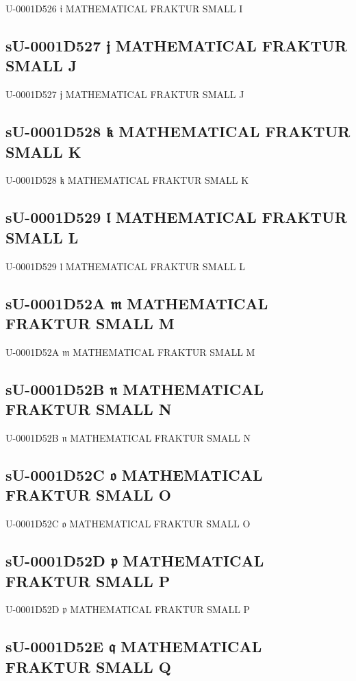U-0001D526 𝔦 MATHEMATICAL FRAKTUR SMALL I

\subsection{sU-0001D527 𝔧 MATHEMATICAL FRAKTUR SMALL J}

U-0001D527 𝔧 MATHEMATICAL FRAKTUR SMALL J

\subsection{sU-0001D528 𝔨 MATHEMATICAL FRAKTUR SMALL K}

U-0001D528 𝔨 MATHEMATICAL FRAKTUR SMALL K

\subsection{sU-0001D529 𝔩 MATHEMATICAL FRAKTUR SMALL L}

U-0001D529 𝔩 MATHEMATICAL FRAKTUR SMALL L

\subsection{sU-0001D52A 𝔪 MATHEMATICAL FRAKTUR SMALL M}

U-0001D52A 𝔪 MATHEMATICAL FRAKTUR SMALL M

\subsection{sU-0001D52B 𝔫 MATHEMATICAL FRAKTUR SMALL N}

U-0001D52B 𝔫 MATHEMATICAL FRAKTUR SMALL N

\subsection{sU-0001D52C 𝔬 MATHEMATICAL FRAKTUR SMALL O}

U-0001D52C 𝔬 MATHEMATICAL FRAKTUR SMALL O

\subsection{sU-0001D52D 𝔭 MATHEMATICAL FRAKTUR SMALL P}

U-0001D52D 𝔭 MATHEMATICAL FRAKTUR SMALL P

\subsection{sU-0001D52E 𝔮 MATHEMATICAL FRAKTUR SMALL Q}

